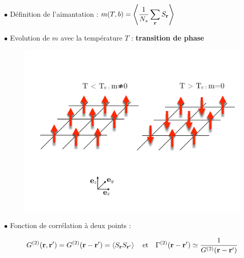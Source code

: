 \documentclass[9pt]{beamer}
\begin{document}
\begin{frame}
		\justifying
		\vspace*{22pt}
			$\bullet$ Définition de l'aimantation : $ \displaystyle m(T,b) = \left< \frac{1}{N_s} \sum_{\bf r} S_{\bf r} \right> $
		
		\vspace*{11pt}
		$\bullet$ Evolution de $m$ avec la température $T$ : \textbf{transition de phase}
					
\begin{figure}[H]
	\begin{center}
		\includegraphics[scale =0.25]{Transition.pdf}
	\end{center}
\end{figure}





	$\bullet$ Fonction de corrélation à deux points :
	
	\begin{equation*}
		G^{(2)}({\bf r}, {\bf r}') = G^{(2)}({\bf r} - {\bf r}') = \left< S_{\bf r} S_{{\bf r}'} \right> \quad \text{et} \quad \Gamma^{(2)}({\bf r} - {\bf r}') \simeq \frac{1}{G^{(2)}({\bf r} - {\bf r}')}
	\end{equation*}
	
		
\end{frame}
    
\end{document}
